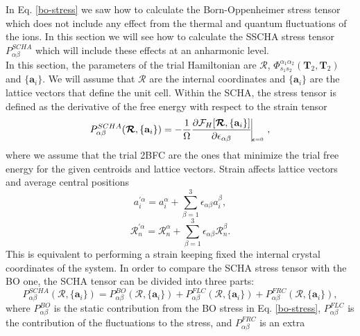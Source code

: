 In Eq. \ref{bo-stress} we saw how to calculate the Born-Oppenheimer stress tensor which does not include any effect from the thermal and quantum fluctuations of the ions. In this section we will see how to calculate 
the SSCHA stress tensor $P_{\alpha\beta}^{SCHA}$ which will include these effects at an anharmonic level. \\

In this section, the parameters of the trial Hamiltonian are $\boldsymbol{\mathcal{R}}$, $\Phi_{s_{1}s_{2}}^{\alpha_{1}\alpha_{2}}(\mathbf{T}_{2},\mathbf{T}_{2})$ and $\{\mathbf{a}_{i}\}$. We will assume 
that $\boldsymbol{\mathcal{R}}$ are the internal coordinates and $\{\mathbf{a}_{i}\}$ are the lattice vectors that define the unit cell. Within the SCHA, the stress tensor is defined as the derivative of the free energy 
with respect to the strain tensor
\begin{equation}
\label{scha-stress}
 P_{\alpha\beta}^{SCHA}(\boldsymbol{\mathcal{R}},\{\mathbf{a}_{i}\})=-\frac{1}{\Omega}\frac{\partial\mathcal{F}_{H}[\boldsymbol{\mathcal{R}},\{\mathbf{a}_{i}\}]}{\partial\epsilon_{\alpha\beta}}\vline_{_{_{_{_{_{_{_{
\boldsymbol{\epsilon}=0}}}}}}}}, 
\end{equation}  
where we assume that the trial 2BFC are the ones that minimize the trial free energy for the given centroids and 
lattice vectors. Strain affects lattice vectors and average central positions 
\begin{equation}
a_{i}^{'\alpha}=a_{i}^{\alpha}+\sum_{\beta=1}^{3}\epsilon_{\alpha\beta}a_{i}^{\beta},
\end{equation}
\begin{equation}
\mathcal{R}_{n}^{'\alpha}=\mathcal{R}_{n}^{\alpha}+\sum_{\beta=1}^{3}\epsilon_{\alpha\beta}\mathcal{R}_{n}^{\beta}.
\end{equation}
This is equivalent to performing a strain keeping fixed the internal crystal coordinates of the system. In order to compare the SCHA stress tensor with the BO one, the SCHA tensor can be divided into three 
parts\cite{monacelli2018pressure}:
\begin{equation}
 P_{\alpha\beta}^{SCHA}(\boldsymbol{\mathcal{R}},\{\mathbf{a}_{i}\})=P_{\alpha\beta}^{BO}(\boldsymbol{\mathcal{R}},\{\mathbf{a}_{i}\})+P_{\alpha\beta}^{FLC}(\boldsymbol{\mathcal{R}},\{\mathbf{a}_{i}\})+
 P_{\alpha\beta}^{FRC}(\boldsymbol{\mathcal{R}},\{\mathbf{a}_{i}\}),
\end{equation}
where $P_{\alpha\beta}^{BO}$ is the static contribution from the BO stress in Eq. \ref{bo-stress}, $P_{\alpha\beta}^{FLC}$ is the contribution of the fluctuations to the stress, and $P_{\alpha\beta}^{FRC}$ is an extra 

